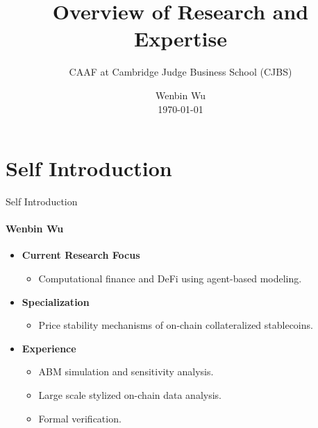 \documentclass{beamer}
\title{Overview of Research and Expertise}
\subtitle{CAAF at Cambridge Judge Business School (CJBS)\\\vspace{2cm}}
\author{Wenbin Wu\\ \today}
\begin{document}
\shorthandoff{-}
\frame[c]{\maketitle}


\section{Self Introduction}

\begin{frame}{Self Introduction}
\framesubtitle{Wenbin Wu}
    \begin{itemize}
        \item \textbf{Current Research Focus}
        \begin{itemize}
            \item Computational finance and DeFi using agent-based modeling.
        \end{itemize}

        \item \textbf{Specialization}
        \begin{itemize}
            \item Price stability mechanisms of on-chain collateralized stablecoins.
        \end{itemize}

        \item \textbf{Experience}
        \begin{itemize}
            \item ABM simulation and sensitivity analysis. 
            \item Large scale stylized on-chain data analysis.
            \item Formal verification.
        \end{itemize}
    \end{itemize}
\end{frame}
\end{document}
